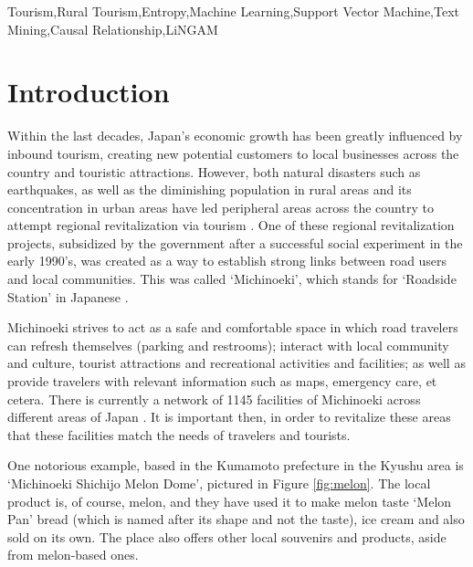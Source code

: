 \documentclass[review]{elsarticle}
\begin{document}
\begin{frontmatter}
\begin{abstract}
\end{abstract}

\begin{keyword}
Tourism\sep Rural Tourism\sep Entropy\sep Machine Learning\sep Support Vector Machine\sep Text Mining\sep Causal Relationship\sep LiNGAM
\end{keyword}

\end{frontmatter}

\section{Introduction}\label{intro}

Within the last decades, Japan’s economic growth has been greatly influenced by inbound tourism, creating new potential customers to local businesses across the country and touristic attractions. However, both natural disasters such as earthquakes, as well as the diminishing population in rural areas and its concentration in urban areas have led peripheral areas across the country to attempt regional revitalization via tourism \cite[][]{jones2009}. One of these regional revitalization projects, subsidized by the government after a successful social experiment in the early 1990’s, was created as a way to establish strong links between road users and local communities. This was called ‘Michinoeki’, which stands for ‘Roadside Station’ in Japanese \cite[][]{yokota2006-a}. 

Michinoeki strives to act as a safe and comfortable space in which road travelers can refresh themselves (parking and restrooms); interact with local community and culture, tourist attractions and recreational activities and facilities; as well as provide travelers with relevant information such as maps, emergency care, et cetera. There is currently a network of \num[group-separator={,}]{1145} facilities of Michinoeki across different areas of Japan \cite[][]{michinoeki}. It is important then, in order to revitalize these areas that these facilities match the needs of travelers and tourists. 

One notorious example, based in the Kumamoto prefecture in the Kyushu area is ‘Michinoeki Shichijo Melon Dome’, pictured in Figure \ref{fig:melon}. The local product is, of course, melon, and they have used it to make melon taste ‘Melon Pan’ bread (which is named after its shape and not the taste), ice cream and also sold on its own. The place also offers other local souvenirs and products, aside from melon-based ones.
\end{document}
